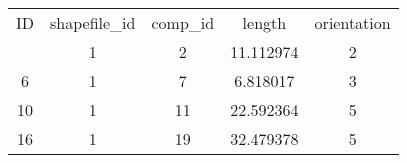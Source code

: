 \begin{tabular}{ccccc}
    \toprule
    ID & shapefile\_id & comp\_id & length & orientation\\
    \otoprule
    1   &   1   &   2   &   11.112974   &   2\\
    6   &   1   &   7   &   6.818017    &   3\\
    10  &   1   &   11  &   22.592364   &   5\\
    16  &   1   &   19  &   32.479378   &   5\\
    \bottomrule
\end{tabular}
